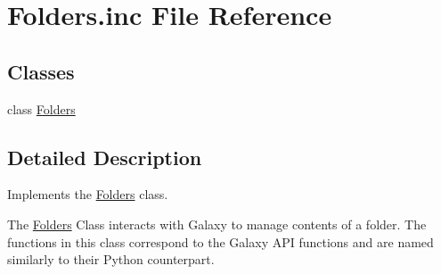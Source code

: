 \hypertarget{Folders_8inc}{}\section{Folders.\+inc File Reference}
\label{Folders_8inc}
\subsection*{Classes}
\begin{DoxyCompactItemize}
\item 
class \hyperlink{classFolders}{Folders}
\end{DoxyCompactItemize}


\subsection{Detailed Description}
Implements the \hyperlink{classFolders}{Folders} class.

The \hyperlink{classFolders}{Folders} Class interacts with Galaxy to manage contents of a folder. The functions in this class correspond to the Galaxy A\+PI functions and are named similarly to their Python counterpart. 